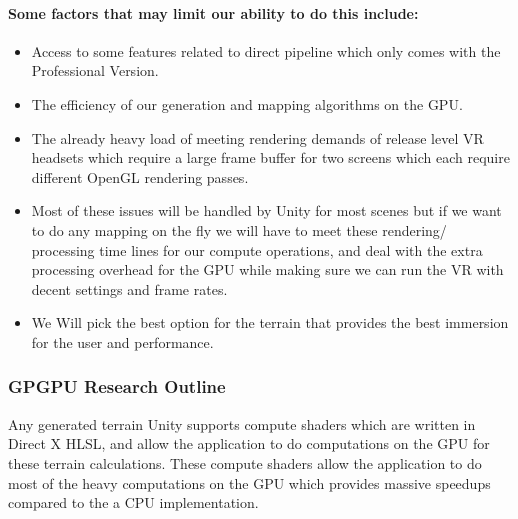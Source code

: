 \documentclass[a4paper,10pt]{article}
\begin{document}
\paragraph{Some factors that may limit our ability to do this include:}
\begin{itemize}
\item Access to some features related to direct pipeline which only comes with the Professional Version.
\item The efficiency of our generation and mapping algorithms on the GPU.
\item The already heavy load of meeting rendering demands of release level VR headsets which require a large frame buffer for two screens which each require different OpenGL rendering passes.
\item Most of these issues will be handled by Unity for most scenes but if we want to do any mapping on the fly we will have to meet these rendering/ processing time lines for our compute operations, 
and deal with the extra processing overhead for the GPU while making sure we can run the VR with decent settings and frame rates. 
\item We Will pick the best option for the terrain that provides the best immersion for the user and performance.
\end{itemize}
\pagebreak
\subsubsection{GPGPU Research Outline}
Any generated terrain Unity supports compute shaders which are written in Direct X HLSL, and allow the application to do computations on the GPU for
these terrain calculations. These compute shaders allow the application to do most of the heavy computations on the GPU which provides massive speedups compared to the a CPU implementation.
\end{document}
